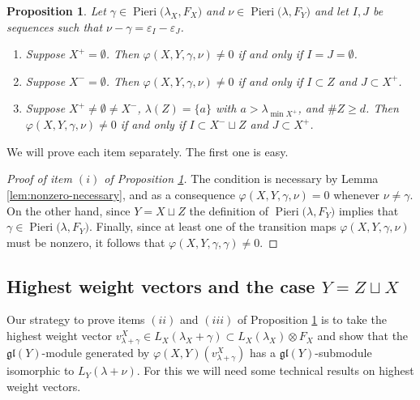 \documentclass[11pt,fleqn]{amsart}
\renewcommand\phi{\varphi}
\renewcommand\epsilon{\varepsilon}
\newtheorem{prop}[thm]{Proposition}
\theoremstyle{definition}
\theoremstyle{remark}
\theoremstyle{remark}
\newcommand\gl{\mathfrak{gl}}
\newcommand\Pieri[2]{\operatorname{Pieri}{(#1},{#2)}}
\newcommand\map[4]{\phi(#3,#4,#1,#2)}
\begin{document}
\begin{prop}
\label{prop:nonzero-sufficient}
Let $\gamma \in \Pieri{\lambda_X}{F_X}$ and $\nu \in \Pieri{\lambda}{F_Y}$ and let
$I, J$ be sequences such that $\nu - \gamma = \epsilon_I - \epsilon_J$. 
\begin{enumerate}
  \item Suppose $X^+ = \emptyset$. Then $\map{\gamma}{\nu}{X}{Y} \neq 0$ if and 
    only if $I = J = \emptyset$.
  \item Suppose $X^- = \emptyset$. Then $\map{\gamma}{\nu}{X}{Y} \neq 0$ if and 
    only if $I \subset Z$ and $J \subset X^+$.
  \item Suppose $X^+ \neq \emptyset \neq X^-$, $\lambda(Z) = \{a\}$ 
    with $a > \lambda_{\min X^+}$, and $\#Z \geq d$. Then 
    $\map{\gamma}{\nu}{X}{Y} \neq 0$ if and only if $I \subset X^- \sqcup Z$ 
    and $J \subset X^+$. 
\end{enumerate}
\end{prop}
We will prove each item separately. The first one is easy.

\begin{proof}[Proof of item $(i)$ of Proposition \ref{prop:nonzero-sufficient}]
The condition is necessary by Lemma \ref{lem:nonzero-necessary}, and as a 
consequence $\phi(X,Y,\gamma,\nu) = 0$ whenever $\nu \neq \gamma$. On 
the other hand, since $Y = X \sqcup Z$ the definition of $\Pieri{\lambda}{F_Y}$ 
implies that $\gamma \in \Pieri{\lambda}{F_Y}$. Finally, since at least one of 
the transition maps $\map{\gamma}{\nu}{X}{Y}$ must be nonzero, it follows that 
$\map{\gamma}{\gamma}{X}{Y} \neq 0$.
\end{proof}

\subsection{Highest weight vectors and the case $Y = Z \sqcup X$}
Our strategy to prove items $(ii)$ and $(iii)$ of Proposition 
\ref{prop:nonzero-sufficient} is to take the highest weight vector 
$v_{\lambda + \gamma}^X \in L_X(\lambda_X + \gamma) \subset L_X(\lambda_X) 
\otimes F_X$ and show that the $\gl(Y)$-module generated by $\phi(X,Y)
(v^X_{\lambda + \gamma})$ has a $\gl(Y)$-submodule isomorphic to $L_Y(\lambda + 
\nu)$. For this we will need some technical results on highest weight vectors.
\end{document}
